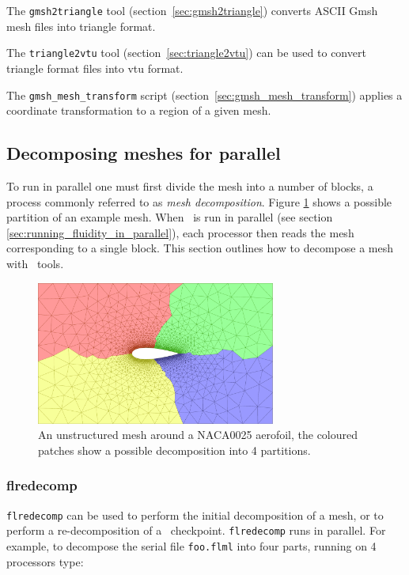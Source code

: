 The \lstinline[language = Bash]+gmsh2triangle+ tool (section~\ref{sec:gmsh2triangle}) converts ASCII Gmsh mesh files into triangle format.

The \lstinline[language = Bash]+triangle2vtu+ tool (section~\ref{sec:triangle2vtu}) can be used to convert triangle format files into vtu format. 

The \lstinline[language = Bash]+gmsh_mesh_transform+ script (section~\ref{sec:gmsh_mesh_transform}) applies a coordinate transformation to a region of a given mesh. 

\subsection{Decomposing meshes for parallel}
\label{decomp_meshes_parallel}
To run in parallel one must first divide the mesh into a number of blocks, a process
commonly referred to as \emph{mesh decomposition}. Figure \ref{fig:NACA0025_mesh_with_partitions}
shows a possible partition of an example mesh. When \fluidity\ is run in parallel (see section
\ref{sec:running_fluidity_in_parallel}), each processor then reads the mesh corresponding to a
single block. This section outlines how to decompose a mesh with \fluidity\ tools.
\begin{figure}[htbp]
 \centering
  \includegraphics[width=0.7\textwidth]{misc_images/NACA0025_mesh_with_partitions.pdf}
  \caption{An unstructured mesh around a NACA0025 aerofoil, the coloured patches show a
           possible decomposition into 4 partitions.}
  \label{fig:NACA0025_mesh_with_partitions}
\end{figure}

\subsubsection{flredecomp}
\label{mesh!meshing tools!flredecomp}
\lstinline[language=bash]+flredecomp+ can be used to perform the initial decomposition of a mesh, or to perform a re-decomposition of a \fluidity\ checkpoint. \lstinline[language=bash]+flredecomp+ runs in parallel. 
For example, to decompose the serial file \lstinline+foo.flml+
into four parts, running on 4 processors type:


